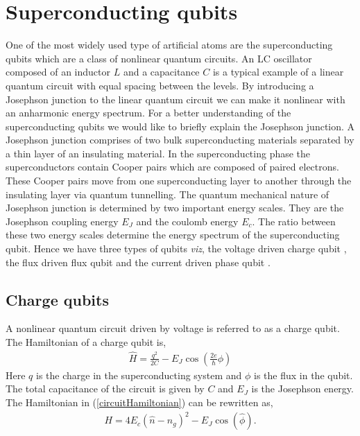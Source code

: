 \documentclass[twocolumn, aps, rmp, amsmath, amssymb, nofootinbib, superscriptaddress, longbibliography, floatfix, table-of-contents, eqsecnum]{revtex4-1}
\begin{document}
\section{Superconducting qubits}

One of the most widely used type of artificial atoms are the superconducting qubits \cite{bib:martinis1985energy, bib:shnirman1997quantum, bib:averin1998adiabatic, bib:devoret2004superconducting, bib:makhlin2001quantum} which are a class of nonlinear quantum circuits. An LC oscillator composed of an inductor $L$ and a capacitance $C$ is a typical example of a linear quantum circuit with equal spacing between the levels. By introducing a Josephson junction to the linear quantum circuit we can make it nonlinear with an anharmonic energy spectrum. For a better understanding of the superconducting qubits we would like to briefly explain the Josephson junction. A Josephson junction \cite{bib:josephson1974the} comprises of two bulk superconducting materials separated by a thin layer of an insulating material. In the superconducting phase the superconductors contain Cooper pairs which are composed of paired electrons. These Cooper pairs move from one superconducting layer to another through the insulating layer via quantum tunnelling. The quantum mechanical nature of Josephson junction is determined by two important energy scales. They are the Josephson coupling energy $E_{J}$ and the coulomb energy $E_{c}$. The ratio between these two energy scales determine the energy spectrum of the superconducting qubit. Hence we have three types of qubits {\it viz}, the voltage driven charge qubit \cite{bib:bouchiat1998quantum, bib:nakamura1999coherent}, the flux driven flux qubit \cite{bib:friedman2000quantum, bib:van2000quantum} and the current driven phase qubit \cite{bib:martinis2002rabi}. 

\subsection{Charge qubits}

A nonlinear quantum circuit driven by voltage is referred to as a charge qubit. The Hamiltonian of a charge qubit is,
\begin{align}
\hat{H} = \frac{q^{2}}{2C} - E_{J} \cos \left( \frac{2e}{\hbar} \phi \right)
\label{circuitHamiltonian}
\end{align}
Here $q$ is the charge in the superconducting system and $\phi$ is the flux in the qubit. The total capacitance of the circuit is given by $C$ and $E_{J}$ is the Josephson energy. The Hamiltonian in (\ref{circuitHamiltonian}) can be rewritten as,
\begin{align}\label{eq:charge_qubit_hamiltonian}
H = 4E_{c} (\hat{n} - n_{g})^{2} - E_{J} \cos (\hat{\phi}) .
\end{align}
\end{document}
